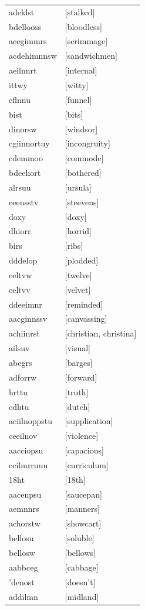 \documentclass{article}
\begin{document}
\begin{tabular}{ll}
adeklst & [stalked] \\
bdellooss & [bloodless] \\
acegimmrs & [scrimmage] \\
acdehimnnsw & [sandwichmen] \\
aeilnnrt & [internal] \\
ittwy & [witty] \\
eflnnu & [funnel] \\
bist & [bits] \\
dinorsw & [windsor] \\
cgiinnortuy & [incongruity] \\
cdemmoo & [commode] \\
bdeehort & [bothered] \\
alrsuu & [ursula] \\
eeensstv & [steevens] \\
doxy & [doxy] \\
dhiorr & [horrid] \\
birs & [ribs] \\
dddelop & [plodded] \\
eeltvw & [twelve] \\
eeltvv & [velvet] \\
ddeeimnr & [reminded] \\
aacginnssv & [canvassing] \\
achiinrst & [christian, christina] \\
ailsuv & [visual] \\
abegrs & [barges] \\
adforrw & [forward] \\
hrttu & [truth] \\
cdhtu & [dutch] \\
aciilnoppstu & [supplication] \\
ceeilnov & [violence] \\
aacciopsu & [capacious] \\
ccilmrruuu & [curriculum] \\
18ht & [18th] \\
aacenpsu & [saucepan] \\
aemnnrs & [manners] \\
achorstw & [showcart] \\
bellosu & [soluble] \\
bellosw & [bellows] \\
aabbceg & [cabbage] \\
'denost & [doesn't] \\
addilmn & [midland] \\

\end{tabular}
\end{document}
